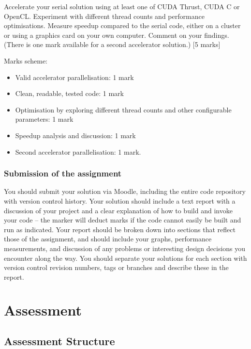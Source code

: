 Accelerate your serial solution using at least one of CUDA Thrust, CUDA
C or OpenCL. Experiment with different thread counts and performance
optimisations. Measure speedup compared to the serial code, either on a
cluster or using a graphics card on your own computer. Comment on your
findings. (There is one mark available for a second accelerator
solution.) {[}5 marks{]}

Marks scheme:

\begin{itemize}
\itemsep1pt\parskip0pt
\item
  Valid accelerator parallelisation: 1 mark
\item
  Clean, readable, tested code: 1 mark
\item
  Optimisation by exploring different thread counts and other
  configurable parameters: 1 mark
\item
  Speedup analysis and discussion: 1 mark
\item
  Second accelerator parallelisation: 1 mark.
\end{itemize}

\subsubsection{Submission of the
assignment}\label{submission-of-the-assignment}

You should submit your solution via Moodle, including the entire code
repository with version control history. Your solution should include a
text report with a discussion of your project and a clear explanation of
how to build and invoke your code -- the marker will deduct marks if the
code cannot easily be built and run as indicated. Your report should be
broken down into sections that reflect those of the assignment, and
should include your graphs, performance measurements, and discussion of
any problems or interesting design decisions you encounter along the
way. You should separate your solutions for each section with version
control revision numbers, tags or branches and describe these in the
report.

\section{Assessment}\label{assessment}

\subsection{Assessment Structure}\label{assessment-structure}

